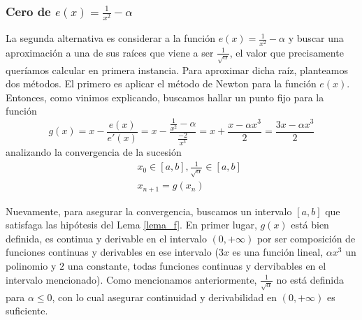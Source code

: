 		\subsubsection{Cero de $e(x) = \frac{1}{x^2} - \alpha$}
		La segunda alternativa es considerar a la función $e(x) = \frac{1}{x^2} - \alpha$ y buscar una aproximación a una de sus raíces que viene a ser $\frac{1}{\sqrt{\alpha}}$, el valor que precisamente queríamos calcular en primera instancia. Para aproximar dicha raíz, planteamos dos métodos. El primero es aplicar el método de Newton para la función $e(x)$. Entonces, como vinimos explicando, buscamos hallar un punto fijo para la función
		\begin{equation}
			g(x) = x - \frac{e(x)}{e'(x)} = x - \frac{\frac{1}{x^2} - \alpha}{\frac{-2}{x^3}} = x + \frac{x - \alpha x^3}{2} = \frac{3x - \alpha x^3}{2}
		\label{g_e}
		\end{equation}
analizando la convergencia de la sucesión
		\begin{eqnarray}
		  && x_0 \in [a,b], \frac{1}{\sqrt{\alpha}} \in [a,b] \nonumber \\
		  && x_{n+1} = g(x_n) \nonumber
		\end{eqnarray}
		
Nuevamente, para asegurar la convergencia, buscamos un intervalo $[a,b]$ que satisfaga las hipótesis del Lema \ref{lema_f}.
  En primer lugar, $g(x)$ está bien definida, es continua y derivable en el intervalo $(0, +\infty)$ por ser composición de funciones continuas y derivables en ese intervalo ($3x$ es una función lineal, $\alpha x^3$ un polinomio y $2$ una constante, todas funciones continuas y dervibables en el intervalo mencionado). Como mencionamos anteriormente, $\frac{1}{\sqrt{\alpha}}$ no está definida para $\alpha \leq 0$, con lo cual asegurar continuidad y derivabilidad en $(0,+\infty)$ es suficiente.\\
  

